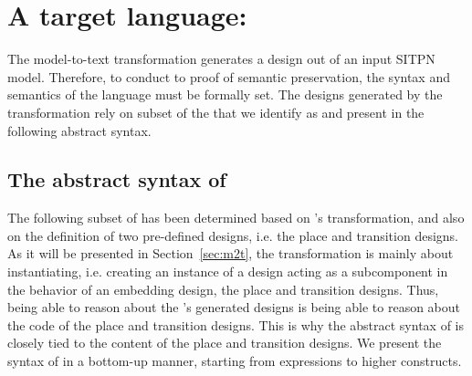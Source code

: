 \section{A target language: \hvhdl{}}
\label{sec:hvhdl}

The \hilecop{} model-to-text transformation generates a \vhdl{} design
out of an input SITPN model. Therefore, to conduct to proof of
semantic preservation, the syntax and semantics of the \vhdl{}
language must be formally set. The designs generated by the \hilecop{}
transformation rely on subset of the \vhdl{} that we identify as
\hvhdl{} and present in the following abstract syntax.

\subsection{The abstract syntax of \hvhdl{}}
\label{subsec:abs-syntax}

The following subset of \vhdl{} has been determined based on
\hilecop{}'s transformation, and also on the definition of two
pre-defined designs, i.e. the place and transition designs. As it will
be presented in Section~\ref{sec:m2t}, the \hilecop{} transformation
is mainly about instantiating, i.e. creating an instance of a design
acting as a subcomponent in the behavior of an embedding design, the
place and transition designs. Thus, being able to reason about the
\hilecop{}'s generated \vhdl{} designs is being able to reason about
the code of the place and transition designs. This is why the abstract
syntax of \hvhdl{} is closely tied to the content of the place and
transition designs.  We present the syntax of \hvhdl{} in a bottom-up
manner, starting from expressions to higher constructs.

